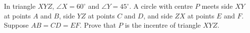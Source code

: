 In triangle $XYZ$, $\angle X=60^\circ$ and $\angle Y=45^\circ$. A circle with centre $P$ meets side $XY$ at points $A$ and $B$, side $YZ$ at points $C$ and $D$, and side $ZX$ at points $E$ and $F$. Suppose $AB=CD=EF$. Prove that $P$ is the incentre of triangle $XYZ$.
